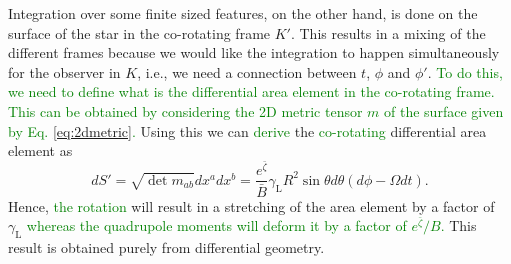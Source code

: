 \documentclass{aa}
\newcommand{\be}{\begin{equation}}
\newcommand{\ee}{\end{equation}}
\newcommand{\refe}[1]{\textcolor{green}{{#1}}}
\newcommand{\Ob}{\ensuremath{\hat{\Omega}}}
\newcommand{\zetab}{\ensuremath{\bar{\zeta}}}
\newcommand{\Bb}{\ensuremath{\bar{B}}}
\newcommand{\lgamma}{\gamma_{\text{L}}}
\begin{document}
Integration over some finite sized features, on the other hand, is done on the surface of the star in the co-rotating frame $K'$.
This results in a mixing of the different frames because we would like the integration to happen simultaneously for the observer in $K$, i.e., we need a connection between $t$, $\phi$ and $\phi'$.
\refe{To do this, we need to define what is the differential area element in the co-rotating frame.}
\refe{This can be obtained by considering the 2D metric tensor $m$ of the surface given by Eq. \eqref{eq:2dmetric}.}
Using this we can \refe{derive} the \refe{co-rotating} differential area element as
\be\label{eq:dSp}
dS' = \sqrt{\det m_{ab}} dx^a dx^b = \frac{e^{\zetab}}{\Bb} \lgamma R^2 \sin\theta d\theta (d\phi - \Omega dt).
\ee
Hence, \refe{the rotation} will result in a stretching of the area element by a factor of $\lgamma$ \refe{whereas the quadrupole moments will deform it by a factor of $e^{\zetab}/B$.}
This result is obtained purely from differential geometry.
\end{document}
